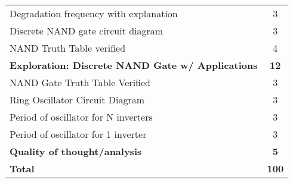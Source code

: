 \documentclass[12pt]{../manual}
\begin{document}
\begin{table}[ht!]
\begin{tabular}{l|c}
Degradation frequency with explanation & 3 \\
Discrete NAND gate circuit diagram & 3 \\
NAND Truth Table verified & 4 \\ \hline
{\bf Exploration: Discrete NAND Gate w/ Applications} & {\bf 12} \\
NAND Gate Truth Table Verified & 3 \\
Ring Oscillator Circuit Diagram & 3 \\
Period of oscillator for N inverters & 3 \\
Period of oscillator for 1 inverter & 3 \\ \hline
{\bf Quality of thought/analysis} & {\bf 5} \\ \hline \hline
{\bf Total}						& {\bf 100} \\ \hline
\end{tabular}
\end{table}
\vfill %
\end{document}

